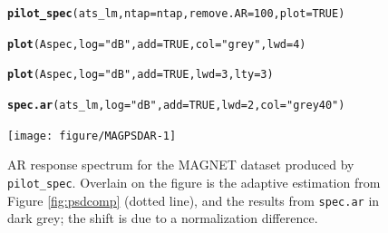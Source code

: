 \documentclass[10pt]{article}\usepackage[]{graphicx}\usepackage[]{color}
\makeatletter
\newcommand{\hlnum}[1]{\textcolor[rgb]{0.686,0.059,0.569}{#1}}%
\newcommand{\hlstr}[1]{\textcolor[rgb]{0.192,0.494,0.8}{#1}}%
\newcommand{\hlstd}[1]{\textcolor[rgb]{0.345,0.345,0.345}{#1}}%
\newcommand{\hlkwc}[1]{\textcolor[rgb]{0.333,0.667,0.333}{#1}}%
\newcommand{\hlkwd}[1]{\textcolor[rgb]{0.737,0.353,0.396}{\textbf{#1}}}%
\newenvironment{kframe}{%
 \def\at@end@of@kframe{}%
 \ifinner\ifhmode%
  \def\at@end@of@kframe{\end{minipage}}%
  \begin{minipage}{\columnwidth}%
 \fi\fi%
 \def\FrameCommand##1{\hskip\@totalleftmargin \hskip-\fboxsep
 \colorbox{shadecolor}{##1}\hskip-\fboxsep
     \hskip-\linewidth \hskip-\@totalleftmargin \hskip\columnwidth}%
 \MakeFramed {\advance\hsize-\width
   \@totalleftmargin\z@ \linewidth\hsize
   \@setminipage}}%
 {\par\unskip\endMakeFramed%
 \at@end@of@kframe}
\newenvironment{knitrout}{}{} %
\newcommand{\Rcmd}[1]{\texttt{#1}}
\makeatother
\begin{document}
\begin{figure}[h!]
\begin{center}
\begin{knitrout}
\color{fgcolor}\begin{kframe}
\begin{alltt}
\hlkwd{pilot_spec}\hlstd{(ats_lm,} \hlkwc{ntap}\hlstd{=ntap,} \hlkwc{remove.AR}\hlstd{=}\hlnum{100}\hlstd{,} \hlkwc{plot}\hlstd{=}\hlnum{TRUE}\hlstd{)}
\end{alltt}


{\ttfamily\noindent\color{warningcolor}{\#\# Warning in Pspec\$spec/Pspec\_ar\$spec: longer object length is not a multiple of shorter object length}}

{\ttfamily\noindent\bfseries\color{errorcolor}{\#\# Error in matplot(x\$freq, x\$spec, type = type, add = TRUE, ...): 'x' and 'y' must have same number of rows}}\begin{alltt}
\hlkwd{plot}\hlstd{(Aspec,} \hlkwc{log}\hlstd{=}\hlstr{"dB"}\hlstd{,} \hlkwc{add}\hlstd{=}\hlnum{TRUE}\hlstd{,} \hlkwc{col}\hlstd{=}\hlstr{"grey"}\hlstd{,} \hlkwc{lwd}\hlstd{=}\hlnum{4}\hlstd{)}
\end{alltt}


{\ttfamily\noindent\bfseries{}}\begin{alltt}
\hlkwd{plot}\hlstd{(Aspec,} \hlkwc{log}\hlstd{=}\hlstr{"dB"}\hlstd{,} \hlkwc{add}\hlstd{=}\hlnum{TRUE}\hlstd{,} \hlkwc{lwd}\hlstd{=}\hlnum{3}\hlstd{,} \hlkwc{lty}\hlstd{=}\hlnum{3}\hlstd{)}
\end{alltt}


{\ttfamily\noindent\bfseries{}}\begin{alltt}
\hlkwd{spec.ar}\hlstd{(ats_lm,} \hlkwc{log}\hlstd{=}\hlstr{"dB"}\hlstd{,} \hlkwc{add}\hlstd{=}\hlnum{TRUE}\hlstd{,} \hlkwc{lwd}\hlstd{=}\hlnum{2}\hlstd{,} \hlkwc{col}\hlstd{=}\hlstr{"grey40"}\hlstd{)}
\end{alltt}
\end{kframe}
\texttt{[image: figure/MAGPSDAR-1]} 

\end{knitrout}
\caption{AR response spectrum for the MAGNET dataset produced by 
\Rcmd{pilot\_spec}. Overlain on the figure is the adaptive estimation 
from Figure \ref{fig:psdcomp} (dotted line),
and the results from \Rcmd{spec.ar} in dark grey; the shift is due to a
normalization difference.}
\label{fig:arspecvar}
\end{center}
\end{figure}
\end{document}
